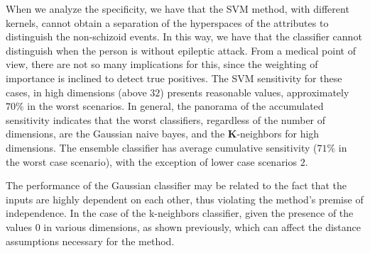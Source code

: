 When we analyze the specificity, we have that the SVM method, with different kernels, cannot obtain a separation of the hyperspaces of the attributes to distinguish the non-schizoid events. In this way, we have that the classifier cannot distinguish when the person is without epileptic attack. From a medical point of view, there are not so many implications for this, since the weighting of importance is inclined to detect true positives. The SVM sensitivity for these cases, in high dimensions (above $ 32 $) presents reasonable values, approximately $70\%$ in the worst scenarios. In general, the panorama of the accumulated sensitivity indicates that the worst classifiers, regardless of the number of dimensions, are the Gaussian naive bayes, and the \textbf{K}-neighbors for high dimensions. The ensemble classifier has average cumulative sensitivity ($ 71 \% $ in the worst case scenario), with the exception of lower case scenarios $ 2 $.

The performance of the Gaussian classifier may be related to the fact that the inputs are highly dependent on each other, thus violating the method's premise of independence. In the case of the k-neighbors classifier, given the presence of the values $ 0 $ in various dimensions, as shown previously, which can affect the distance assumptions necessary for the method.


